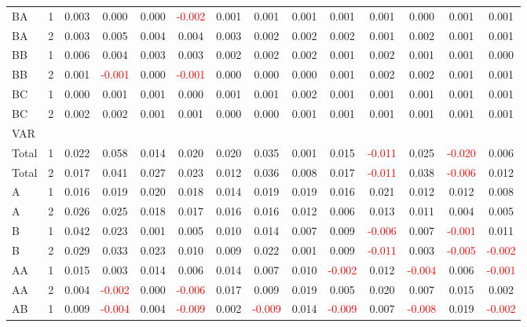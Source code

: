 \begin{table}[H]
{\begin{tabular}{llcccccccccccc}
BA & 1 & 0.003 & 0.000 & 0.000 & \textcolor{red}{-0.002} & 0.001 & 0.001 & 0.001 & 0.001 & 0.001 & 0.000 & 0.001 & 0.001\\
BA & 2 & 0.003 & 0.005 & 0.004 & 0.004 & 0.003 & 0.002 & 0.002 & 0.002 & 0.001 & 0.002 & 0.001 & 0.001\\
BB & 1 & 0.006 & 0.004 & 0.003 & 0.003 & 0.002 & 0.002 & 0.002 & 0.001 & 0.002 & 0.001 & 0.001 & 0.000\\
BB & 2 & 0.001 & \textcolor{red}{-0.001} & 0.000 & \textcolor{red}{-0.001} & 0.000 & 0.000 & 0.000 & 0.001 & 0.002 & 0.002 & 0.001 & 0.001\\
BC & 1 & 0.000 & 0.001 & 0.001 & 0.000 & 0.001 & 0.001 & 0.002 & 0.001 & 0.001 & 0.001 & 0.001 & 0.001\\
BC & 2 & 0.002 & 0.002 & 0.001 & 0.001 & 0.000 & 0.000 & 0.001 & 0.001 & 0.001 & 0.001 & 0.001 & 0.001\\
\hline
VAR &  &  &  &  &  &  &  &  &  &  &  &  & \\
\hline
Total & 1 & 0.022 & 0.058 & 0.014 & 0.020 & 0.020 & 0.035 & 0.001 & 0.015 & \textcolor{red}{-0.011} & 0.025 & \textcolor{red}{-0.020} & 0.006\\
Total & 2 & 0.017 & 0.041 & 0.027 & 0.023 & 0.012 & 0.036 & 0.008 & 0.017 & \textcolor{red}{-0.011} & 0.038 & \textcolor{red}{-0.006} & 0.012\\
A & 1 & 0.016 & 0.019 & 0.020 & 0.018 & 0.014 & 0.019 & 0.019 & 0.016 & 0.021 & 0.012 & 0.012 & 0.008\\
A & 2 & 0.026 & 0.025 & 0.018 & 0.017 & 0.016 & 0.016 & 0.012 & 0.006 & 0.013 & 0.011 & 0.004 & 0.005\\
B & 1 & 0.042 & 0.023 & 0.001 & 0.005 & 0.010 & 0.014 & 0.007 & 0.009 & \textcolor{red}{-0.006} & 0.007 & \textcolor{red}{-0.001} & 0.011\\
B & 2 & 0.029 & 0.033 & 0.023 & 0.010 & 0.009 & 0.022 & 0.001 & 0.009 & \textcolor{red}{-0.011} & 0.003 & \textcolor{red}{-0.005} & \textcolor{red}{-0.002}\\
AA & 1 & 0.015 & 0.003 & 0.014 & 0.006 & 0.014 & 0.007 & 0.010 & \textcolor{red}{-0.002} & 0.012 & \textcolor{red}{-0.004} & 0.006 & \textcolor{red}{-0.001}\\
AA & 2 & 0.004 & \textcolor{red}{-0.002} & 0.000 & \textcolor{red}{-0.006} & 0.017 & 0.009 & 0.019 & 0.005 & 0.020 & 0.007 & 0.015 & 0.002\\
AB & 1 & 0.009 & \textcolor{red}{-0.004} & 0.004 & \textcolor{red}{-0.009} & 0.002 & \textcolor{red}{-0.009} & 0.014 & \textcolor{red}{-0.009} & 0.007 & \textcolor{red}{-0.008} & 0.019 & \textcolor{red}{-0.002}\\

\end{tabular}}
\end{table}
